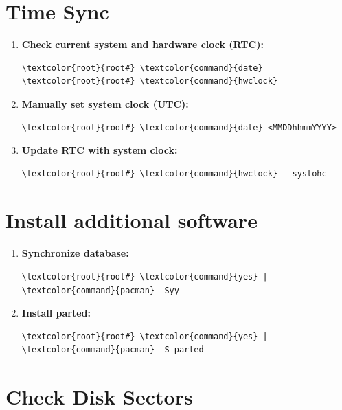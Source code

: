 \documentclass[10pt, a4paper, onecolumn, oneside, titlepage, openany]{book}
\begin{document}
\section{Time Sync}
\begin{enumerate}
    \item \textbf{Check current system and hardware clock (RTC):}
\begin{Verbatim}[commandchars=\\\{\}]
\textcolor{root}{root#} \textcolor{command}{date}
\textcolor{root}{root#} \textcolor{command}{hwclock}
\end{Verbatim}
    \item \textbf{Manually set system clock (UTC):}
\begin{Verbatim}[commandchars=\\\{\}]
\textcolor{root}{root#} \textcolor{command}{date} <MMDDhhmmYYYY>
\end{Verbatim}
    \item \textbf{Update RTC with system clock:}
\begin{Verbatim}[commandchars=\\\{\}]
\textcolor{root}{root#} \textcolor{command}{hwclock} --systohc
\end{Verbatim}
\end{enumerate}

\section{Install additional software}
\begin{enumerate}
    \item \textbf{Synchronize database:}
\begin{Verbatim}[commandchars=\\\{\}]
\textcolor{root}{root#} \textcolor{command}{yes} | \textcolor{command}{pacman} -Syy
\end{Verbatim}
    \item \textbf{Install parted:}
\begin{Verbatim}[commandchars=\\\{\}]
\textcolor{root}{root#} \textcolor{command}{yes} | \textcolor{command}{pacman} -S parted
\end{Verbatim}
\end{enumerate}

\section{Check Disk Sectors}
\end{document}
